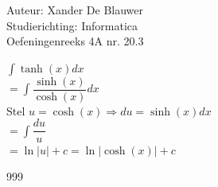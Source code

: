 \documentclass[a4paper]{article}
\begin{document}
\noindent \large Auteur: Xander De Blauwer \\
\noindent \large Studierichting: Informatica\\
\noindent \large Oefeningenreeks 4A nr. 20.3\\

\medskip

\normalsize

$ \displaystyle\int \tanh(x)dx $ \\

$ = \displaystyle\int \dfrac{\sinh(x)}{\cosh(x)}dx$ \\

Stel $u = \cosh(x) \Rightarrow du = \sinh(x)dx $ \\

$ = \displaystyle\int \dfrac{du}{u}$ \\ 

$ = \ln|u| + c = \ln|\cosh(x)| + c$ \\







\begin{thebibliography}{999}
\end{thebibliography}
\end{document}
